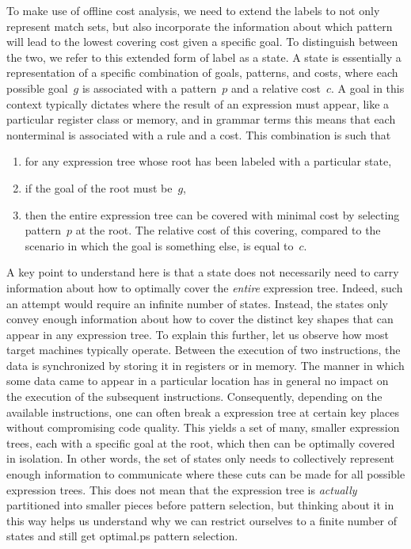 To make use of \gls{offline cost analysis}, we need to extend the labels to not
only represent \glspl{match set}, but also incorporate the information about
which \gls{pattern} will lead to the lowest covering cost given a specific goal.
%
To distinguish between the two, we refer to this extended form of label as a
\gls{state}.
%
A \gls{state} is essentially a representation of a specific combination of
goals, \glspl{pattern}, and costs, where each possible goal~$g$ is associated
with a \gls{pattern}~$p$ and a relative cost~$c$.
%
A goal in this context typically dictates where the result of an expression must
appear, like a particular \gls{register class} or memory, and in \gls{grammar}
terms this means that each \gls{nonterminal} is associated with a \gls{rule} and
a cost.
%
This combination is such that
%
\begin{enumerate}
  \item for any \gls{expression tree} whose \gls{root} has been labeled with a
    particular \gls{state},
  \item if the goal of the \gls{root} must be~$g$\hspace{-1pt},
  \item then the entire \gls{expression tree} can be covered with minimal cost
    by selecting \gls{pattern}~$p$ at the \gls{root}.
    The relative cost of this covering, compared to the scenario in which the
    goal is something else, is equal to~$c$.
\end{enumerate}

A key point to understand here is that a \gls{state} does not necessarily need
to carry information about how to optimally cover the \emph{entire}
\gls{expression tree}.
%
Indeed, such an attempt would require an infinite number of \glspl{state}.
%
Instead, the \glspl{state} only convey enough information about how to cover the
distinct key shapes that can appear in any \gls{expression tree}.
%
To explain this further, let us observe how most \glspl{target machine}
typically operate.
%
Between the execution of two \glspl{instruction}, the data is synchronized by
storing it in \glspl{register} or in memory.
%
The manner in which some data came to appear in a particular location has in
general no impact on the execution of the subsequent \glspl{instruction}.
%
Consequently, depending on the available \glspl{instruction}, one can often
break a \gls{expression tree} at certain key places without compromising code
quality.
%
This yields a set of many, smaller \glspl{expression tree}, each with a specific
goal at the \gls{root}, which then can be optimally covered in isolation.
%
In other words, the set of \glspl{state} only needs to collectively represent
enough information to communicate where these cuts can be made for all possible
\glspl{expression tree}.
%
This does not mean that the \gls{expression tree} is \emph{actually} partitioned
into smaller pieces before \gls{pattern selection}, but thinking about it in
this way helps us understand why we can restrict ourselves to a finite number of
\glspl{state} and still get \gls{optimal.ps} \gls{pattern selection}.

